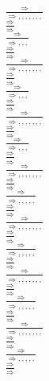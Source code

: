 \documentclass[11pt]{article}
\begin{document}
\begin{center}
\bigskip
\\$\frac{\Rightarrow }{\Rightarrow , , , , , , , }$
\bigskip
\\$\frac{\Rightarrow }{\Rightarrow }$
\bigskip
\\$\frac{\Rightarrow }{\Rightarrow , , , }$
\bigskip
\\$\frac{\Rightarrow }{\Rightarrow }$
\bigskip
\\$\frac{\Rightarrow }{\Rightarrow , , , , , , , }$
\bigskip
\\$\frac{\Rightarrow }{\Rightarrow }$
\bigskip
\\$\frac{\Rightarrow }{\Rightarrow , , , }$
\bigskip
\\$\frac{\Rightarrow }{\Rightarrow }$
\bigskip
\\$\frac{\Rightarrow }{\Rightarrow , , , , , , , }$
\bigskip
\\$\frac{\Rightarrow }{\Rightarrow }$
\bigskip
\\$\frac{\Rightarrow }{\Rightarrow , , , }$
\bigskip
\\$\frac{\Rightarrow }{\Rightarrow }$
\bigskip
\\$\frac{\Rightarrow }{\Rightarrow , , , , , , , }$
\bigskip
\\$\frac{\Rightarrow }{\Rightarrow }$
\bigskip
\\$\frac{\Rightarrow }{\Rightarrow , , , , , }$
\bigskip
\\$\frac{\Rightarrow }{\Rightarrow }$
\bigskip
\\$\frac{\Rightarrow }{\Rightarrow , , , , , , , }$
\bigskip
\\$\frac{\Rightarrow }{\Rightarrow }$
\bigskip
\\$\frac{\Rightarrow }{\Rightarrow , , , , , }$
\bigskip
\\$\frac{\Rightarrow }{\Rightarrow }$
\bigskip
\\$\frac{\Rightarrow }{\Rightarrow , , , , , , , }$
\bigskip
\\$\frac{\Rightarrow }{\Rightarrow }$
\bigskip
\\$\frac{\Rightarrow }{\Rightarrow , , , , , }$
\bigskip
\\$\frac{\Rightarrow }{\Rightarrow }$
\bigskip
\\$\frac{\Rightarrow }{\Rightarrow , , , , , , , }$
\bigskip
\\$\frac{\Rightarrow }{\Rightarrow }$
\bigskip
\\$\frac{\Rightarrow }{\Rightarrow , , , , , }$
\bigskip
\\$\frac{\Rightarrow }{\Rightarrow }$
\bigskip

\end{center}
\end{document}
